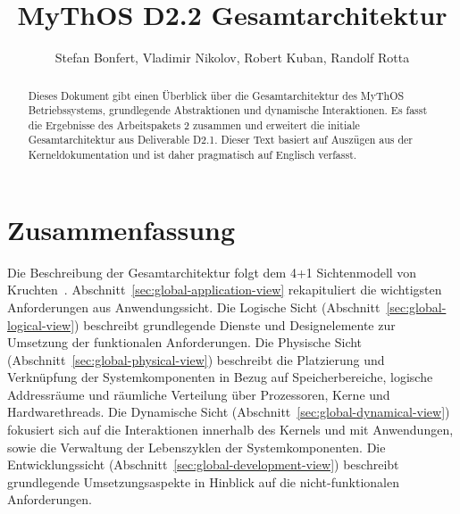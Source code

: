 

\title{MyThOS D2.2 Gesamtarchitektur}
\author{Stefan Bonfert, Vladimir Nikolov, Robert Kuban, Randolf Rotta}



\maketitle

\begin{abstract}
Dieses Dokument gibt einen Überblick über die Gesamtarchitektur des MyThOS 
Betriebssystems, grundlegende Abstraktionen und dynamische Interaktionen. Es 
fasst die Ergebnisse des Arbeitspakets 2 zusammen und erweitert die initiale 
Gesamtarchitektur aus Deliverable D2.1. Dieser Text basiert auf Auszügen aus 
der Kerneldokumentation und ist daher pragmatisch auf Englisch verfasst. 
\end{abstract}

\newpage
\tableofcontents
\newpage

\section{Zusammenfassung}

Die Beschreibung der Gesamtarchitektur folgt dem 4+1 Sichtenmodell von 
Kruchten~\cite{kruchten19954+}. Abschnitt~\ref{sec:global-application-view} 
rekapituliert die wichtigsten Anforderungen aus Anwendungssicht. Die Logische 
Sicht (Abschnitt~\ref{sec:global-logical-view}) beschreibt grundlegende Dienste 
und Designelemente zur Umsetzung der funktionalen Anforderungen. Die Physische 
Sicht (Abschnitt~\ref{sec:global-physical-view}) beschreibt die Platzierung und 
Verknüpfung der Systemkomponenten in Bezug auf Speicherbereiche, logische 
Addressräume und räumliche Verteilung über Prozessoren, Kerne und 
Hardwarethreads. Die Dynamische Sicht 
(Abschnitt~\ref{sec:global-dynamical-view}) fokusiert sich auf die 
Interaktionen innerhalb des Kernels und mit Anwendungen, sowie die Verwaltung 
der Lebenszyklen der Systemkomponenten. Die Entwicklungssicht 
(Abschnitt~\ref{sec:global-development-view}) beschreibt grundlegende 
Umsetzungsaspekte in Hinblick auf die nicht-funktionalen Anforderungen.

